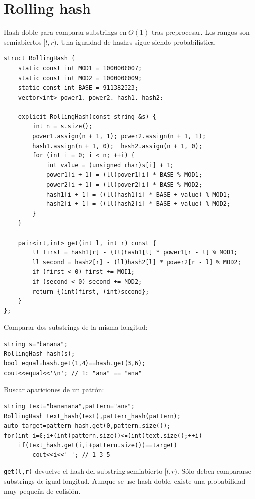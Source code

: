 \section{Rolling hash}

Hash doble para comparar substrings en $O(1)$ tras preprocesar. Los rangos son
semiabiertos $[l,r)$. Una igualdad de hashes sigue siendo probabil\'istica.

\begin{lstlisting}[style=cpp]
struct RollingHash {
    static const int MOD1 = 1000000007;
    static const int MOD2 = 1000000009;
    static const int BASE = 911382323;
    vector<int> power1, power2, hash1, hash2;

    explicit RollingHash(const string &s) {
        int n = s.size();
        power1.assign(n + 1, 1); power2.assign(n + 1, 1);
        hash1.assign(n + 1, 0);  hash2.assign(n + 1, 0);
        for (int i = 0; i < n; ++i) {
            int value = (unsigned char)s[i] + 1;
            power1[i + 1] = (ll)power1[i] * BASE % MOD1;
            power2[i + 1] = (ll)power2[i] * BASE % MOD2;
            hash1[i + 1] = ((ll)hash1[i] * BASE + value) % MOD1;
            hash2[i + 1] = ((ll)hash2[i] * BASE + value) % MOD2;
        }
    }

    pair<int,int> get(int l, int r) const {
        ll first = hash1[r] - (ll)hash1[l] * power1[r - l] % MOD1;
        ll second = hash2[r] - (ll)hash2[l] * power2[r - l] % MOD2;
        if (first < 0) first += MOD1;
        if (second < 0) second += MOD2;
        return {(int)first, (int)second};
    }
};
\end{lstlisting}


Comparar dos substrings de la misma longitud:

\begin{lstlisting}[style=cpp]
string s="banana";
RollingHash hash(s);
bool equal=hash.get(1,4)==hash.get(3,6);
cout<<equal<<'\n'; // 1: "ana" == "ana"
\end{lstlisting}

Buscar apariciones de un patrón:

\begin{lstlisting}[style=cpp]
string text="bananana",pattern="ana";
RollingHash text_hash(text),pattern_hash(pattern);
auto target=pattern_hash.get(0,pattern.size());
for(int i=0;i+(int)pattern.size()<=(int)text.size();++i)
    if(text_hash.get(i,i+pattern.size())==target)
        cout<<i<<' '; // 1 3 5
\end{lstlisting}

\texttt{get(l,r)} devuelve el hash del substring semiabierto $[l,r)$. Sólo
deben compararse substrings de igual longitud. Aunque se use hash doble, existe
una probabilidad muy pequeña de colisión.